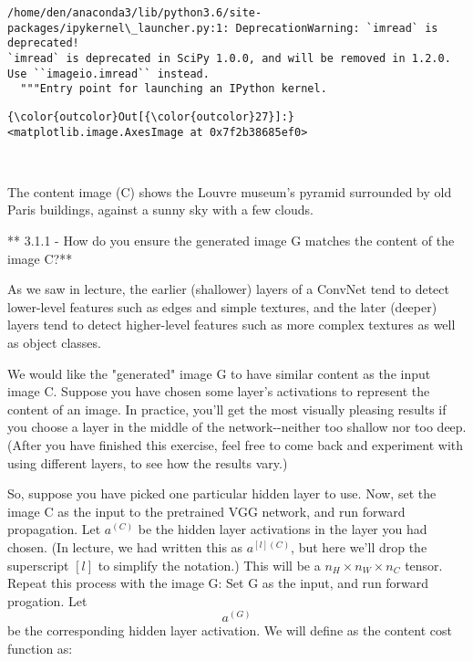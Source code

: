 \documentclass[11pt]{article}
\begin{document}
    \begin{Verbatim}[commandchars=\\\{\}]
/home/den/anaconda3/lib/python3.6/site-packages/ipykernel\_launcher.py:1: DeprecationWarning: `imread` is deprecated!
`imread` is deprecated in SciPy 1.0.0, and will be removed in 1.2.0.
Use ``imageio.imread`` instead.
  """Entry point for launching an IPython kernel.

    \end{Verbatim}

\begin{Verbatim}[commandchars=\\\{\}]
{\color{outcolor}Out[{\color{outcolor}27}]:} <matplotlib.image.AxesImage at 0x7f2b38685ef0>
\end{Verbatim}
            
    \begin{center}
    \end{center}
    { \hspace*{\fill} \\}
    
    The content image (C) shows the Louvre museum's pyramid surrounded by
old Paris buildings, against a sunny sky with a few clouds.

** 3.1.1 - How do you ensure the generated image G matches the content
of the image C?**

As we saw in lecture, the earlier (shallower) layers of a ConvNet tend
to detect lower-level features such as edges and simple textures, and
the later (deeper) layers tend to detect higher-level features such as
more complex textures as well as object classes.

We would like the "generated" image G to have similar content as the
input image C. Suppose you have chosen some layer's activations to
represent the content of an image. In practice, you'll get the most
visually pleasing results if you choose a layer in the middle of the
network-\/-neither too shallow nor too deep. (After you have finished
this exercise, feel free to come back and experiment with using
different layers, to see how the results vary.)

So, suppose you have picked one particular hidden layer to use. Now, set
the image C as the input to the pretrained VGG network, and run forward
propagation. Let \(a^{(C)}\) be the hidden layer activations in the
layer you had chosen. (In lecture, we had written this as
\(a^{[l](C)}\), but here we'll drop the superscript \([l]\) to simplify
the notation.) This will be a \(n_H \times n_W \times n_C\) tensor.
Repeat this process with the image G: Set G as the input, and run
forward progation. Let \[a^{(G)}\] be the corresponding hidden layer
activation. We will define as the content cost function as:
\end{document}
